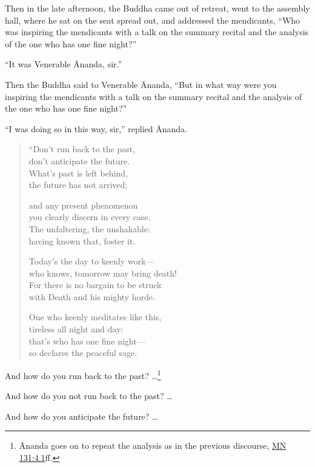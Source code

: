 \documentclass[12pt,openany]{book}%
\begin{document}
Then in the late afternoon, the Buddha came out of retreat, went to the assembly hall, where he sat on the seat spread out, and addressed the mendicants, “Who was inspiring the mendicants with a talk on the summary recital and the analysis of the one who has one fine night?” 

“It was Venerable Ānanda, sir.” 

Then the Buddha said to Venerable Ānanda, “But in what way were you inspiring the mendicants with a talk on the summary recital and the analysis of the one who has one fine night?” 

“I was doing so in this way, sir,” replied Ānanda. 

\begin{verse}%
“Don’t run back to the past, \\
don’t anticipate the future. \\
What’s past is left behind, \\
the future has not arrived; 

and any present phenomenon \\
you clearly discern in every case. \\
The unfaltering, the unshakable: \\
having known that, foster it. 

Today’s the day to keenly work—\\
who knows, tomorrow may bring death! \\
For there is no bargain to be struck \\
with Death and his mighty horde. 

One who keenly meditates like this, \\
tireless all night and day: \\
that’s who has one fine night—\\
so declares the peaceful sage. 

%
\end{verse}

And how do you run back to the past? …\footnote{Ānanda goes on to repeat the analysis as in the previous discourse, \href{https://suttacentral.net/mn131/en/sujato\#4.1}{MN 131:4.1}ff. } 

And how do you not run back to the past? … 

And how do you anticipate the future? … 
\end{document}
